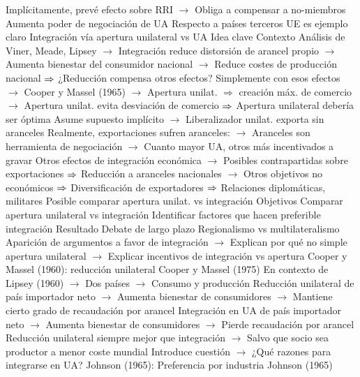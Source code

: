 \documentclass{nuevotema}
\begin{document}
\begin{esquemal}
				\4[] Implícitamente, prevé efecto sobre RRI
				\4[] $\to$ Obliga a compensar a no-miembros
				\4 Aumenta poder de negociación de UA
				\4[] Respecto a países terceros
				\4[] UE es ejemplo claro
		\2 Integración vía apertura unilateral vs UA
			\3 Idea clave
				\4 Contexto
				\4[] Análisis de Viner, Meade, Lipsey
				\4[] $\to$ Integración reduce distorsión de arancel propio
				\4[] $\to$ Aumenta bienestar del consumidor nacional
				\4[] $\to$ Reduce costes de producción nacional
				\4[] $\Rightarrow$ ¿Reducción compensa otros efectos?
				\4[] Simplemente con esos efectos
				\4[] $\to$ Cooper y Massel (1965)
				\4[] $\to$ Apertura unilat. $\Rightarrow$ creación máx. de comercio
				\4[] $\to$ Apertura unilat. evita desviación de comercio
				\4[] $\Rightarrow$ Apertura unilateral debería ser óptima
				\4[] Asume supuesto implícito
				\4[] $\to$ Liberalizador unilat. exporta sin aranceles
				\4[] Realmente, exportaciones sufren aranceles:
				\4[] $\to$ Aranceles son herramienta de negociación
				\4[] $\to$ Cuanto mayor UA, otros más incentivados a gravar
				\4[] Otros efectos de integración económica
				\4[] $\to$ Posibles contrapartidas sobre exportaciones
				\4[] $\Rightarrow$ Reducción a aranceles nacionales
				\4[] $\to$ Otros objetivos no económicos
				\4[] $\Rightarrow$ Diversificación de exportadores
				\4[] $\Rightarrow$ Relaciones diplomáticas, militares
				\4[] Posible comparar apertura unilat. vs integración
				\4 Objetivos
				\4[] Comparar apertura unilateral vs integración
				\4[] Identificar factores que hacen preferible integración
				\4 Resultado
				\4[] Debate de largo plazo
				\4[] Regionalismo vs multilateralismo
				\4[] Aparición de argumentos a favor de integración
				\4[] $\to$ Explican por qué no simple apertura unilateral
				\4[] $\to$ Explicar incentivos de integración vs apertura
			\3 Cooper y Massel (1960): reducción unilateral
				\4 Cooper y Massel (1975)
				\4 En contexto de Lipsey (1960)
				\4[] $\to$ Dos países
				\4[] $\to$ Consumo y producción
				\4 Reducción unilateral de país importador neto
				\4[] $\to$ Aumenta bienestar de consumidores
				\4[] $\to$ Mantiene cierto grado de recaudación por arancel
				\4 Integración en UA de país importador neto
				\4[] $\to$ Aumenta bienestar de consumidores
				\4[] $\to$ Pierde recaudación por arancel
				\4 Reducción unilateral siempre mejor que integración
				\4[] $\to$ Salvo que socio sea productor a menor coste mundial
				\4 Introduce cuestión
				\4[] $\to$ ¿Qué razones para integrarse en UA?
			\3 Johnson (1965): Preferencia por industria
				\4 Johnson (1965)

\end{esquemal}
\end{document}
